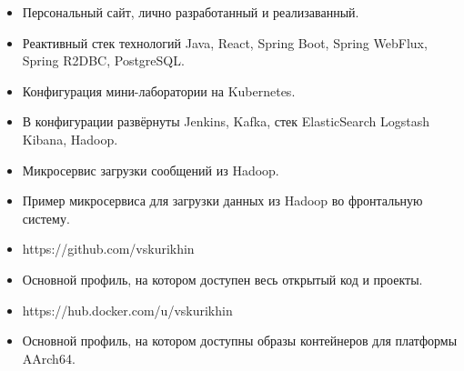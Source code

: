 

\divider




\begin{itemize}
\item {Персональный сайт, лично разработанный и реализаванный.}
\item {Реактивный стек технологий Java, React, Spring Boot, Spring WebFlux, Spring R2DBC, PostgreSQL.}
\end{itemize}
\smallskip

\begin{itemize}
\item {Конфигурация мини-лаборатории на Kubernetes.}
\item {В конфигурации развёрнуты Jenkins, Kafka, стек ElasticSearch Logstash Kibana, Hadoop.}
\end{itemize}
\smallskip

\begin{itemize}
\item {Микросервис загрузки сообщений из Hadoop.}
\item {Пример микросервиса для загрузки данных из Hadoop во фронтальную систему.}
\end{itemize}
\smallskip



\begin{itemize}
\item https://github.com/vskurikhin
\item Основной профиль, на котором доступен весь открытый код и проекты.
\end{itemize}
\smallskip

\begin{itemize}
\item https://hub.docker.com/u/vskurikhin
\item Основной профиль, на котором доступны образы контейнеров для платформы AArch64.
\end{itemize}
\smallskip
